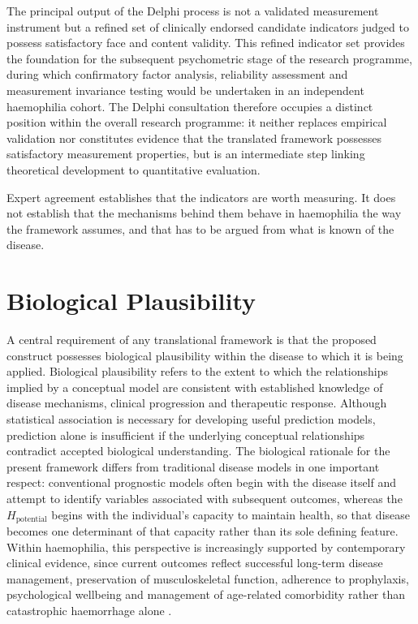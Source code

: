 The principal output of the Delphi process is not a validated measurement instrument but a refined set of clinically endorsed candidate indicators judged to possess satisfactory face and content validity. This refined indicator set provides the foundation for the subsequent psychometric stage of the research programme, during which confirmatory factor analysis, reliability assessment and measurement invariance \citep{meredith_1993,vandenberg_lance_2000} testing would be undertaken in an independent haemophilia cohort. The Delphi consultation therefore occupies a distinct position within the overall research programme: it neither replaces empirical validation nor constitutes evidence that the translated framework possesses satisfactory measurement properties, but is an intermediate step linking theoretical development to quantitative evaluation.

Expert agreement establishes that the indicators are worth measuring. It does
not establish that the mechanisms behind them behave in haemophilia the way the
framework assumes, and that has to be argued from what is known of the disease.

\section{Biological Plausibility}
\label{sec:plausibility}

\noindent A central requirement of any translational framework is that the proposed construct possesses biological plausibility within the disease to which it is being applied. Biological plausibility refers to the extent to which the relationships implied by a conceptual model are consistent with established knowledge of disease mechanisms, clinical progression and therapeutic response. Although statistical association is necessary for developing useful prediction models, prediction alone is insufficient if the underlying conceptual relationships contradict accepted biological understanding. The biological rationale for the present framework differs from traditional disease models in one important respect: conventional prognostic models often begin with the disease itself and attempt to identify variables associated with subsequent outcomes, whereas the $H_{\text{potential}}$ begins with the individual's capacity to maintain health, so that disease becomes one determinant of that capacity rather than its sole defining feature. Within haemophilia, this perspective is increasingly supported by contemporary clinical evidence, since current outcomes reflect successful long-term disease management, preservation of musculoskeletal function, adherence to prophylaxis, psychological wellbeing and management of age-related comorbidity rather than catastrophic haemorrhage alone \citep{srivastava_2020}.

